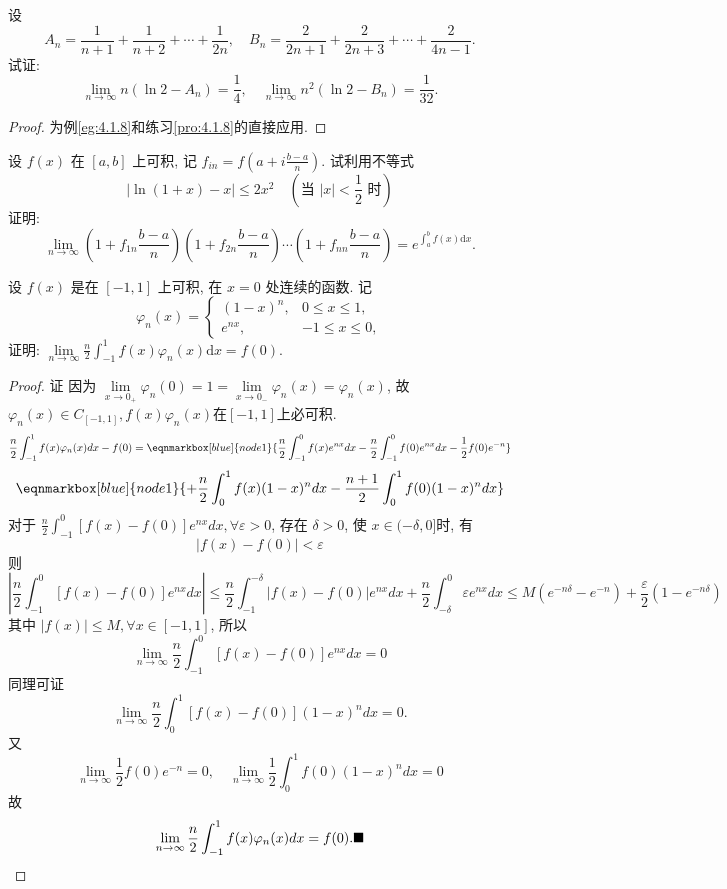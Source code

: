 \documentclass[lang=cn,newtx,10pt,scheme=chinese]{elegantbook}
\begin{document}
\begin{problem}
设
$$ A_n = \frac{1}{n+1} + \frac{1}{n+2} + \cdots + \frac{1}{2n}, \quad B_n = \frac{2}{2n+1} + \frac{2}{2n+3} + \cdots + \frac{2}{4n-1}. $$
试证:
$$ \lim_{n \to \infty} n(\ln 2 - A_n) = \frac{1}{4}, \quad \lim_{n \to \infty} n^2(\ln 2 - B_n) = \frac{1}{32}. $$
\end{problem}
\begin{proof}
    为例\ref{eg:4.1.8}和练习\ref{pro:4.1.8}的直接应用.
\end{proof}

\begin{problem}
设 $f(x)$ 在 $[a,b]$ 上可积, 记 $f_{in} = f\left(a+i\frac{b-a}{n}\right)$. 试利用不等式
$$ |\ln(1+x)-x| \le 2x^2 \quad \left(\text{当 } |x| < \frac{1}{2} \text{ 时}\right) $$
证明:
$$ \lim_{n \to \infty} \left(1+f_{1n}\frac{b-a}{n}\right)\left(1+f_{2n}\frac{b-a}{n}\right)\cdots\left(1+f_{nn}\frac{b-a}{n}\right) = e^{\int_{a}^{b} f(x) \mathrm{d}x}. $$
\end{problem}

\begin{problem}[$\bigstar$]
设 $f(x)$ 是在 $[-1,1]$ 上可积, 在 $x=0$ 处连续的函数. 记
$$ \varphi_n(x) = \begin{cases} (1-x)^n, & 0 \le x \le 1, \\ e^{nx}, & -1 \le x \le 0, \end{cases} $$
证明: $\lim\limits_{n \to \infty} \frac{n}{2} \int_{-1}^{1} f(x) \varphi_n(x) \mathrm{d}x = f(0)$. 
\end{problem}

\begin{proof}
证 因为 $\lim\limits_{x \to 0_+} \varphi_n(0) = 1 = \lim\limits_{x \to 0_-} \varphi_n(x) = \varphi_n(x)$, 故 $\varphi_n(x) \in C_{[-1,1]}, f(x)\varphi_n(x)$在$[-1,1]$上必可积.
\begin{equation*}
\frac{n}{2}\int_{-1}^{1} f(x)\varphi_n(x)dx - f(0) = \eqnmarkbox[blue]{node1}{\frac{n}{2}\int_{-1}^{0} f(x)e^{nx}dx - \frac{n}{2}\int_{-1}^{0} f(0)e^{nx}dx - \frac{1}{2}f(0)e^{-n} }
\end{equation*}
\begin{equation*}
\eqnmarkbox[blue]{node1}{+ \frac{n}{2}\int_{0}^{1} f(x)(1-x)^n dx - \frac{n+1}{2}\int_{0}^{1} f(0)(1-x)^n dx}
\end{equation*}
对于 $\frac{n}{2}\int_{-1}^{0} [f(x)-f(0)]e^{nx}dx, \forall \varepsilon > 0$, 存在 $\delta > 0$, 使 $x \in (-\delta, 0]$时, 有
$$|f(x)-f(0)| < \varepsilon$$
则
$$\left| \frac{n}{2}\int_{-1}^{0} [f(x)-f(0)]e^{nx}dx \right| \le \frac{n}{2}\int_{-1}^{-\delta} |f(x)-f(0)|e^{nx}dx + \frac{n}{2}\int_{-\delta}^{0} \varepsilon e^{nx}dx \le M(e^{-n\delta} - e^{-n}) + \frac{\varepsilon}{2}(1-e^{-n\delta})$$
其中 $|f(x)| \le M, \forall x \in [-1,1]$, 所以
$$\lim\limits_{n \to \infty} \frac{n}{2}\int_{-1}^{0} [f(x)-f(0)]e^{nx}dx = 0$$
同理可证
$$\lim\limits_{n \to \infty} \frac{n}{2}\int_{0}^{1} [f(x)-f(0)](1-x)^n dx = 0.$$
又
$$\lim\limits_{n \to \infty} \frac{1}{2}f(0)e^{-n} = 0, \quad \lim\limits_{n \to \infty} \frac{1}{2}\int_{0}^{1}f(0)(1-x)^n dx = 0$$
故
$$\lim\limits_{n \to \infty} \frac{n}{2}\int_{-1}^{1} f(x)\varphi_n(x)dx = f(0).\hfill \blacksquare$$
\end{proof}
\end{document}
